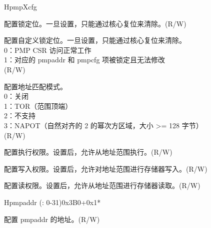 \begin{register}{H}{pmpXcfg}{}
\label{regdesc:pmpXcfg}%
%
%
%
%
%
%
%
\regnewline%
\begin{regdesc}
\begin{reglist}
\label{fielddesc:pmpXcfgL}\item [L] 配置锁定位。一旦设置，只能通过核心复位来清除。(R/W)
\label{fielddesc:pmpXcfgXL}\item [XL] 配置自定义锁定位。一旦设置，只能通过核心复位来清除。\\
0：PMP CSR 访问正常工作 \\
1：对应的 pmpaddr 和 pmpcfg 项被锁定且无法修改 \\
(R/W)
\label{fielddesc:pmpXcfgA}\item [A] 配置地址匹配模式。\\
0：关闭 \\
1：TOR（范围顶端）\\
2：不支持 \\
3：NAPOT（自然对齐的 2 的幂次方区域，大小 >= 128 字节）\\
(R/W)
\label{fielddesc:pmpXcfgX}\item [X] 配置执行权限。设置后，允许从地址范围执行。(R/W)
\label{fielddesc:pmpXcfgW}\item [W] 配置写入权限。设置后，允许对地址范围进行存储器写入。(R/W)
\label{fielddesc:pmpXcfgR}\item [R] 配置读权限。设置后，允许从地址范围进行存储器读取。(R/W)
\end{reglist}
\end{regdesc}
\end{register}

\begin{register}{H}{pmpaddr (: 0-31)}{0x3B0+0x1*}\label{regdesc:pmpaddrN}
%
\regnewline%
\begin{regdesc}\begin{reglist}
\label{fielddesc:ADDR}\item [address] 配置 pmpaddr 的地址。(R/W)
\end{reglist}\end{regdesc}
\end{register}
